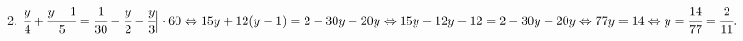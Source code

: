 2. $\cfrac{y}{4}+\cfrac{y-1}{5}=\cfrac{1}{30}-\cfrac{y}{2}-\cfrac{y}{3}\Big|\cdot60\Leftrightarrow15y+12(y-1)=2-30y-20y\Leftrightarrow15y+12y-12=2-30y-20y
\Leftrightarrow77y=14\Leftrightarrow y=\cfrac{14}{77}=\cfrac{2}{11}.$\\

